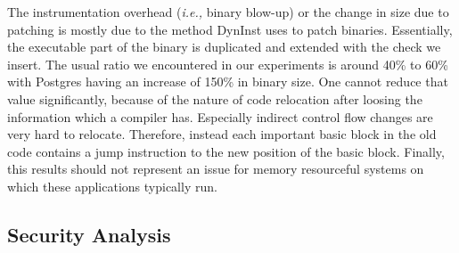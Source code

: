 The instrumentation overhead (\textit{i.e.,} binary blow-up) or the change in size due to patching is mostly due to the method DynInst uses to patch binaries. 
Essentially, the executable part of the binary is duplicated and extended with the check we insert. The usual ratio we encountered in our experiments is 
around 40\% to 60\% with Postgres having an increase of 150\% in binary size. One cannot reduce that 
value significantly, because of the nature of code relocation after loosing the information which a compiler has. Especially indirect control flow 
changes are very hard to relocate. Therefore, instead each important basic block in the old code contains a jump instruction to the new position of the basic block.
Finally, this results should not represent an issue for memory resourceful systems on which these applications typically run.

\subsection{Security Analysis}
\label{RQ5: Security Analysis}
\textit{}

